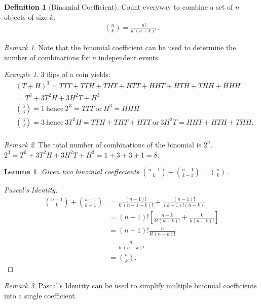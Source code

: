 \documentclass{article}
\theoremstyle{plain}
\newtheorem{lemma}{Lemma}
\theoremstyle{definition}
\newtheorem{definition}{Definition}
\theoremstyle{remark}
\newtheorem{remark}{Remark}
\newtheorem{example}{Example}
\begin{document}
\begin{definition}[Binomial Coefficient]
  Count everyway to combine a set of $n$ objects of size $k$.
  \begin{align*}
    \binom{n}{k} = \frac{n!}{k!(n-k)!}.
  \end{align*}
\end{definition}
\begin{remark}
  Note that the binomial coefficient can be used to determine the number of combinations for $n$ independent events.
\end{remark}
\begin{example}
  3 flips of a coin yields:
  \begin{align*}
  &(T + H)^3 = TTT + TTH + THT + HTT + HHT+ HTH + THH + HHH \\
  &= T^3 + 3T^2H + 3H^2T + H^3 \\
  &\binom{3}{3} = 1\ \text{hence}\ T^3 = TTT\ \text{or}\ H^3 = HHH \\
  &\binom{3}{2} = 3\ \text{hence}\ 3T^2H = TTH + THT + HTT\ \text{or}\ 3H^2T = HHT+HTH+THH. \\
  \end{align*}
\end{example}
\begin{remark}
  The total number of combinations of the binomial is $2^n$. \\
  $2^3 = T^3 + 3T^2H + 3H^2T + H^3 = 1 + 3 + 3 + 1 = 8$.
\end{remark}
\begin{lemma}
  Given two binomial coeffecients $\binom{n-1}{k} + \binom{n-1}{k-1} = \binom{n}{k}$.
\end{lemma}
\begin{proof}[Pascal's Identity]
  \begin{align*}
    \binom{n - 1}{k} + \binom{n - 1}{k - 1} &= \frac{(n-1)!}{k!(n - 1 - k)!} + \frac{(n - 1)!}{(k-1)!(n-k)!} \\
    &= (n - 1)![\frac{n-k}{k!(n-k)!} + \frac{k}{k(n-k)!}] \\
    &= (n - 1)!\frac{n}{k!(n-k)!} \\
    &= \frac{n!}{k!(n - k)!} \\
    &= \binom{n}{k}.
  \end{align*}
\end{proof}
\begin{remark}
 Pascal's Identity can be used to simplify multiple binomial coefficients into a single coefficient.
\end{remark}
\end{document}
